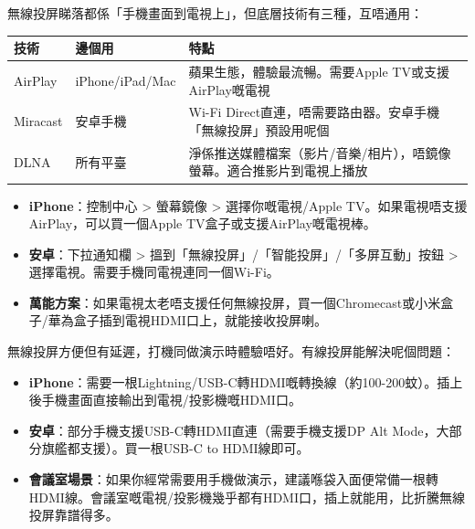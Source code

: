 


無線投屏睇落都係「手機畫面到電視上」，但底層技術有三種，互唔通用：

\begin{center}
\begin{tabularx}{\linewidth}{|X|X|X|}
\hline
\textbf{技術} & \textbf{邊個用} & \textbf{特點} \tabularnewline
\hline
AirPlay & iPhone/iPad/Mac & 蘋果生態，體驗最流暢。需要Apple TV或支援AirPlay嘅電視 \tabularnewline
Miracast & 安卓手機 & Wi-Fi Direct直連，唔需要路由器。安卓手機「無線投屏」預設用呢個 \tabularnewline
DLNA & 所有平臺 & 淨係推送媒體檔案（影片/音樂/相片），唔鏡像螢幕。適合推影片到電視上播放 \tabularnewline
\hline
\end{tabularx}
\end{center}


\begin{itemize}
  \item \textbf{iPhone}：控制中心 > 螢幕鏡像 > 選擇你嘅電視/Apple TV。如果電視唔支援AirPlay，可以買一個Apple TV盒子或支援AirPlay嘅電視棒。
  \item \textbf{安卓}：下拉通知欄 > 搵到「無線投屏」/「智能投屏」/「多屏互動」按鈕 > 選擇電視。需要手機同電視連同一個Wi-Fi。
  \item \textbf{萬能方案}：如果電視太老唔支援任何無線投屏，買一個Chromecast或小米盒子/華為盒子插到電視HDMI口上，就能接收投屏喇。
\end{itemize}


無線投屏方便但有延遲，打機同做演示時體驗唔好。有線投屏能解決呢個問題：

\begin{itemize}
  \item \textbf{iPhone}：需要一根Lightning/USB-C轉HDMI嘅轉換線（約100-200蚊）。插上後手機畫面直接輸出到電視/投影機嘅HDMI口。
  \item \textbf{安卓}：部分手機支援USB-C轉HDMI直連（需要手機支援DP Alt Mode，大部分旗艦都支援）。買一根USB-C to HDMI線即可。
  \item \textbf{會議室場景}：如果你經常需要用手機做演示，建議喺袋入面便常備一根轉HDMI線。會議室嘅電視/投影機幾乎都有HDMI口，插上就能用，比折騰無線投屏靠譜得多。
\end{itemize}

